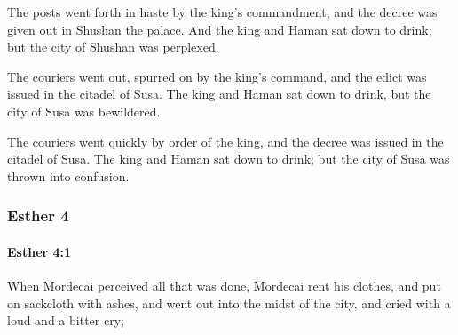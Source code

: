 			\begin{versebox}
					\item[BHS] 
					\item[LXX] 
					\item[ASV] The posts went forth in haste by the king's commandment, and the decree was given out in Shushan the palace. And the king and Haman sat down to drink; but the city of Shushan was perplexed.
					\item[NIV] The couriers went out, spurred on by the king’s command, and the edict was issued in the citadel of Susa. The king and Haman sat down to drink, but the city of Susa was bewildered.
					\item[NRSV] The couriers went quickly by order of the king, and the decree was issued in the citadel of Susa. The king and Haman sat down to drink; but the city of Susa was thrown into confusion.
			\end{versebox}
	\subsubsection{Esther 4} %
		\label{ESTHER-4}

		\paragraph{Esther 4:1} %
			\label{ESTHER-4-1}

			When Mordecai perceived all that was done, Mordecai rent his clothes, and put on sackcloth with ashes, and went out into the midst of the city, and cried with a loud and a bitter cry;

